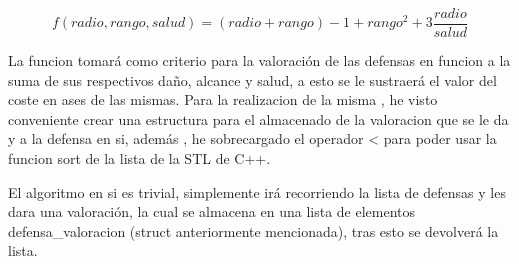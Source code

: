 $$ f(radio,rango,salud)=(radio+rango)-1+rango^2+3\frac{radio}{salud} $$

La funcion tomará como criterio para la valoración de las defensas en funcion a la suma 
de sus respectivos daño, alcance y salud, a esto se le sustraerá el valor del coste en 
ases de las mismas.
Para la realizacion de la misma , he visto conveniente crear una estructura para el almacenado 
de la valoracion que se le da y a la defensa en si, además , he sobrecargado el operador < para 
poder usar la funcion sort de la lista de la STL de C++.

El algoritmo en si es trivial, simplemente irá recorriendo la lista de defensas y les dara una 
valoración, la cual se almacena en una lista de elementos defensa_valoracion (struct anteriormente
mencionada), tras esto se devolverá la lista.